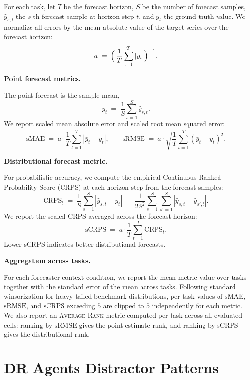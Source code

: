 \documentclass[]{servicenow}
\newcommand{\paragraphtight}[1]{%
  \par\vspace{-0.75\parskip}\vspace{0.3em}%
  \noindent\textbf{#1}\hspace{0.4em}\ignorespaces
}
\begin{document}
For each task, let $T$ be the forecast horizon, $S$ be the number of forecast samples, $\hat{y}_{s,t}$ the $s$-th forecast sample at horizon step $t$, and $y_t$ the ground-truth value.
We normalize all errors by the mean absolute value of the target series over the forecast horizon:
\[
a \;=\; \Bigl(\,\frac{1}{T}\sum_{t=1}^{T} |y_t|\Bigr)^{-1}.
\]

\paragraphtight{Point forecast metrics.}
The point forecast is the sample mean,
\[
\bar{y}_t \;=\; \frac{1}{S}\sum_{s=1}^{S}\hat{y}_{s,t}.
\]
We report scaled mean absolute error and scaled root mean squared error:
\[
\mathrm{sMAE}
\;=\; a \cdot \frac{1}{T}\sum_{t=1}^{T}\left|\bar{y}_t - y_t\right|,
\qquad
\mathrm{sRMSE}
\;=\; a \cdot
\sqrt{\frac{1}{T}\sum_{t=1}^{T}\left(\bar{y}_t - y_t\right)^2}.
\]

\paragraphtight{Distributional forecast metric.}
For probabilistic accuracy, we compute the empirical Continuous Ranked Probability Score (CRPS) at each horizon step from the forecast samples:
\[
\mathrm{CRPS}_t
\;=\;
\frac{1}{S}\sum_{s=1}^{S}\left|\hat{y}_{s,t} - y_t\right|
\;-\;
\frac{1}{2S^2}\sum_{s=1}^{S}\sum_{s'=1}^{S}
\left|\hat{y}_{s,t} - \hat{y}_{s',t}\right|.
\]
We report the scaled CRPS averaged across the forecast horizon:
\[
\mathrm{sCRPS}
\;=\;
a \cdot \frac{1}{T}\sum_{t=1}^{T}\mathrm{CRPS}_t.
\]
Lower sCRPS indicates better distributional forecasts.


\paragraphtight{Aggregation across tasks.}
For each forecaster-context condition, we report the mean metric value over tasks together with the standard error of the mean across tasks.
Following standard winsorization for heavy-tailed benchmark distributions, per-task values of $\mathrm{sMAE}$, $\mathrm{sRMSE}$, and $\mathrm{sCRPS}$ exceeding $5$ are clipped to $5$ independently for each metric.
We also report an \textsc{Average Rank} metric computed per task across all evaluated cells: ranking by $\mathrm{sRMSE}$ gives the point-estimate rank, and ranking by $\mathrm{sCRPS}$ gives the distributional rank.


\section{DR Agents Distractor Patterns}
\label{app:distractor_citation}
\end{document}
